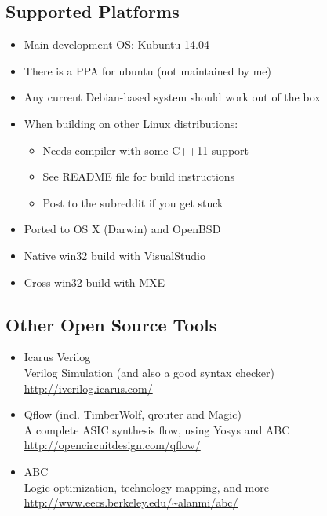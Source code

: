 \subsection{Supported Platforms}

\begin{frame}{\subsecname}
\begin{itemize}
\item Main development OS: Kubuntu 14.04
\item There is a PPA for ubuntu (not maintained by me)
\item Any current Debian-based system should work out of the box
\item When building on other Linux distributions:
\begin{itemize}
\item Needs compiler with some C++11 support
\item See README file for build instructions
\item Post to the subreddit if you get stuck
\end{itemize}
\item Ported to OS X (Darwin) and OpenBSD
\item Native win32 build with VisualStudio
\item Cross win32 build with MXE
\end{itemize}
\end{frame}


\subsection{Other Open Source Tools}

\begin{frame}{\subsecname}
\begin{itemize}
\item Icarus Verilog \\
\smallskip\hskip1cm{}Verilog Simulation (and also a good syntax checker) \\
\smallskip\hskip1cm{}\url{http://iverilog.icarus.com/}

\bigskip
\item Qflow (incl. TimberWolf, qrouter and Magic) \\
\smallskip\hskip1cm{}A complete ASIC synthesis flow, using Yosys and ABC \\
\smallskip\hskip1cm{}\url{http://opencircuitdesign.com/qflow/}

\bigskip
\item ABC \\
\smallskip\hskip1cm{}Logic optimization, technology mapping, and more \\
\smallskip\hskip1cm{}\url{http://www.eecs.berkeley.edu/~alanmi/abc/}
\end{itemize}
\end{frame}

